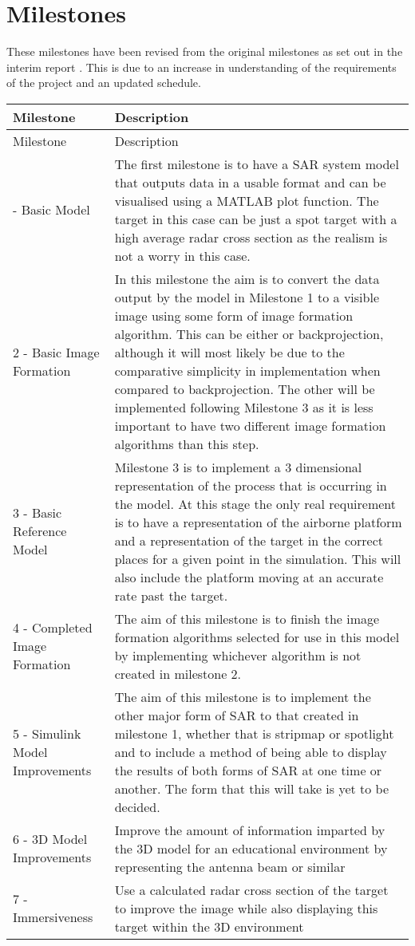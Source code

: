 \section{Milestones}
These milestones have been revised from the original milestones as set out in the interim report \cite{moffatSyntheticApertureImaging}. This is due to an increase in understanding of the requirements of the project and an updated schedule. 
\begin{longtabu} to \textwidth {|X[0.5]|X|}
\hline

	Milestone & Description\\
	\hline
	\endfirsthead
	\hline
	Milestone & Description \\
	\hline 
	\endhead
	\hline
	 - Basic Model & The first milestone is to have a SAR system model that outputs data in a usable format and can be visualised using a MATLAB plot function. The target in this case can be just a spot target with a high average radar cross section as the realism is not a worry in this case.  \\
	2 - Basic Image Formation & In this milestone the aim is to convert the data output by the model in Milestone 1 to a visible image using some form of image formation algorithm. This can be either  or backprojection, although it will most likely be  due to the comparative simplicity in implementation when compared to backprojection. The other will be implemented following Milestone 3 as it is less important to have two different image formation algorithms than this step. \\
	3 - Basic Reference Model & Milestone 3 is to implement a 3 dimensional representation of the process that is occurring in the model. At this stage the only real requirement is to have a representation of the airborne platform and a representation of the target in the correct places for a given point in the simulation. This will also include the platform moving at an accurate rate past the target. \\
	4 - Completed Image Formation & The aim of this milestone is to finish the image formation algorithms selected for use in this model by implementing whichever algorithm is not created in milestone 2. \\
	5 - Simulink Model Improvements & The aim of this milestone is to implement the other major form of SAR to that created in milestone 1, whether that is stripmap or spotlight and to include a method of being able to display the results of both forms of SAR at one time or another. The form that this will take is yet to be decided. \\
	6 - 3D Model Improvements & Improve the amount of information imparted by the 3D model for an educational environment by representing the antenna beam or similar \\
	7 - Immersiveness & Use a calculated radar cross section of the target to improve the image while also displaying this target within the 3D environment \\
	
\end{longtabu}
